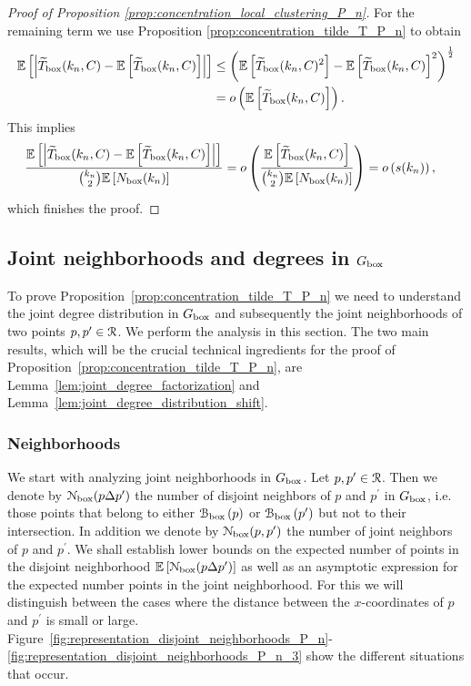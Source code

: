 \begin{proof}[Proof of Proposition \ref{prop:concentration_local_clustering_P_n}]
For the remaining term we use Proposition \ref{prop:concentration_tilde_T_P_n} to obtain
\begin{align*}
	\mathbb{E}\left[\left|\widetilde{T}_{\text{box}}(k_n,C) - \mathbb{E}\left[\widetilde{T}_{\text{box}}(k_n,C)\right]\right|\right]
	&\le \left(\mathbb{E}\left[\widetilde{T}_{\text{box}}(k_n,C)^2\right] 
		- \mathbb{E}\left[\widetilde{T}_{\text{box}}(k_n,C)\right]^2\right)^{\frac{1}{2}}\\
	&= o\left(\mathbb{E}\left[\widetilde{T}_{\text{box}}(k_n,C)\right]\right).
\end{align*}
This implies
\begin{align*}
	\frac{\mathbb{E}\left[\left|\widetilde{T}_{\text{box}}(k_n,C) - \mathbb{E}\left[\widetilde{T}_{\text{box}}(k_n,C)\right]\right|\right]}
		{\binom{k_n}{2}\mathbb{E}\left[N_{\text{box}}(k_n)\right]}
	&= o\left(\frac{\mathbb{E}\left[\widetilde{T}_{\text{box}}(k_n,C)\right]}{\binom{k_n}{2}\mathbb{E}\left[N_{\text{box}}(k_n)\right]}\right)
	= o\left(s(k_n)\right),
\end{align*}
which finishes the proof.
\end{proof}

\subsection{Joint neighborhoods and degrees in $G_{\text{box}}$}

To prove Proposition~\ref{prop:concentration_tilde_T_P_n} we need to understand the joint degree distribution in $G_{\text{box}}$ and subsequently the joint neighborhoods of two points $p, p^\prime \in {\mathcal R}$. We perform the analysis in this section. The two main results, which will be the crucial technical ingredients for the proof of Proposition~\ref{prop:concentration_tilde_T_P_n}, are Lemma~\ref{lem:joint_degree_factorization} and Lemma~\ref{lem:joint_degree_distribution_shift}.

\subsubsection*{Neighborhoods}

We start with analyzing joint neighborhoods in $G_{\text{box}}$. Let $p, p^\prime \in {\mathcal R}$. Then we denote by ${\mathcal N}_{\text{box}}(p\Delta p^\prime)$ the number of disjoint neighbors of $p$ and $p^\prime$ in $G_{\text{box}}$, i.e. those points that belong to either ${\mathcal B}_{\text{box}}\left(p\right)$ or ${\mathcal B}_{\text{box}}\left(p^\prime\right)$ but not to their intersection. In addition we denote by ${\mathcal N}_{\text{box}}(p,p^\prime)$ the number of joint neighbors of $p$ and $p^\prime$. We shall establish lower bounds on the expected number of points in the disjoint neighborhood $\mathbb{E}\left[{\mathcal N}_{\text{box}}(p\Delta p^\prime)\right]$ as well as an asymptotic expression for the expected number points in the joint neighborhood. For this we will distinguish between the cases where the distance between the $x$-coordinates of $p$ and $p^\prime$ is small or large. Figure~\ref{fig:representation_disjoint_neighborhoods_P_n}-\ref{fig:representation_disjoint_neighborhoods_P_n_3} show the different situations that occur.

